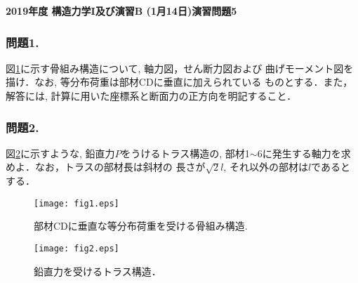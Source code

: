 \documentclass[10pt,a4j]{jarticle}
\newlength{\minitwocolumn}
\begin{document}
\newcommand{\fat}[1]{\mbox{\boldmath $#1$}}
\newcommand{\D}{\partial}
\newcommand{\w}{\omega}
\newcommand{\ga}{\alpha}
\newcommand{\gb}{\beta}
\newcommand{\gx}{\xi}
\newcommand{\gz}{\zeta}
\newcommand{\vhat}[1]{\hat{\fat{#1}}}
\newcommand{\spc}{\vspace{0.7\baselineskip}}
\newcommand{\halfspc}{\vspace{0.3\baselineskip}}

\pagestyle{empty}
\newcommand{\twofig}[2]
 {
   \begin{figure}[h]
     \begin{minipage}[t]{\minitwocolumn}
         \begin{center}   #1
         \end{center}
     \end{minipage}
         \hspace{\columnsep}
     \begin{minipage}[t]{\minitwocolumn}
         \begin{center} #2
         \end{center}
     \end{minipage}
   \end{figure}
 }
\begin{center}
{\Large \bf 2019年度 構造力学I及び演習B (1月14日)演習問題5} \\
\end{center}
\subsubsection*{問題1.}
図\ref{fig:fig1}に示す骨組み構造について, 軸力図，せん断力図および
曲げモーメント図を描け．なお, 等分布荷重は部材CDに垂直に加えられている
ものとする．また，解答には, 計算に用いた座標系と断面力の正方向を明記すること．
\subsubsection*{問題2.}
図\ref{fig:fig2}に示すような, 鉛直力$P$をうけるトラス構造の, 
部材1$\sim$6に発生する軸力を求めよ．なお，トラスの部材長は斜材の
長さが$\sqrt{2}l$, それ以外の部材は$l$であるとする．
\begin{figure}[h]
	\begin{center}
	\texttt{[image: fig1.eps]} 
	\end{center}
	\caption{部材CDに垂直な等分布荷重を受ける骨組み構造.}
	\label{fig:fig1}
\end{figure}
\begin{figure}[h]
	\begin{center}
	\texttt{[image: fig2.eps]} 
	\end{center}
	\caption{鉛直力を受けるトラス構造．} 
	\label{fig:fig2}
\end{figure}
\end{document}
